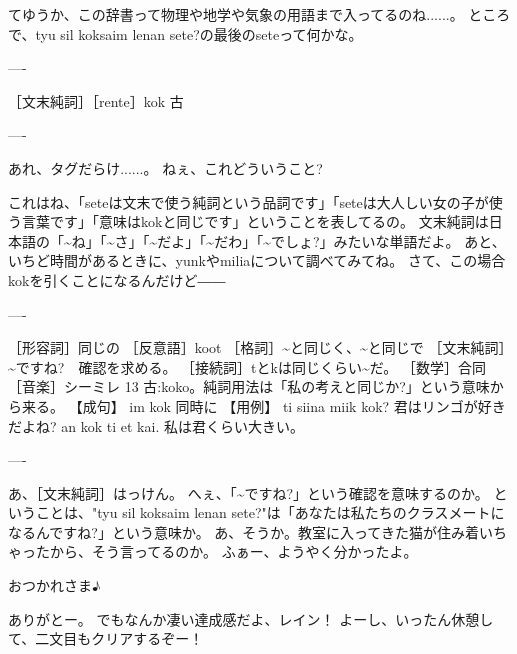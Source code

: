 てゆうか、この辞書って物理や地学や気象の用語まで入ってるのね......。
ところで、tyu sil koksaim lenan sete?の最後のseteって何かな。

----

［文末純詞］［rente］kok
古

----


あれ、タグだらけ......。
ねぇ、これどういうこと?


これはね、「seteは文末で使う純詞という品詞です」「seteは大人しい女の子が使う言葉です」「意味はkokと同じです」ということを表してるの。
文末純詞は日本語の「\~{}ね」「\~{}さ」「\~{}だよ」「\~{}だわ」「\~{}でしょ?」みたいな単語だよ。
あと、いちど時間があるときに、yunkやmiliaについて調べてみてね。
さて、この場合kokを引くことになるんだけど――

----

［形容詞］同じの
［反意語］koot
［格詞］\~{}と同じく、\~{}と同じで
［文末純詞］\~{}ですね?　確認を求める。
［接続詞］tとkは同じくらい\~{}だ。
［数学］合同
［音楽］シーミレ
13 古:koko。純詞用法は「私の考えと同じか?」という意味から来る。
【成句】
im kok 同時に
【用例】
ti siina miik kok? 君はリンゴが好きだよね?
an kok ti et kai. 私は君くらい大きい。


----

あ、［文末純詞］はっけん。
へぇ、「\~{}ですね?」という確認を意味するのか。
ということは、"tyu sil koksaim lenan sete?"は「あなたは私たちのクラスメートになるんですね?」という意味か。
あ、そうか。教室に入ってきた猫が住み着いちゃったから、そう言ってるのか。
ふぁー、ようやく分かったよ。


おつかれさま♪


ありがとー。
でもなんか凄い達成感だよ、レイン！
よーし、いったん休憩して、二文目もクリアするぞー！